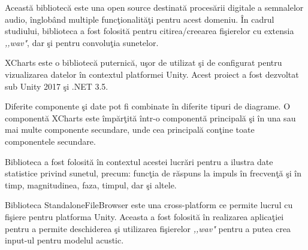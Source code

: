 	Aceast\u{a} bibliotec\u{a} este una open source destinat\u{a} proces\u{a}rii digitale a semnalelor audio, \^{i}nglob\^{a}nd multiple func\c{t}ionalit\u{a}\c{t}i pentru acest domeniu. \^{I}n cadrul studiului, biblioteca a fost folosit\u{a} pentru citirea/creearea fi\c{s}ierelor cu extensia \textit{,,wav"}, dar \c{s}i pentru convolu\c{t}ia sunetelor.
	\bigskip

	XCharts este o bibliotec\u{a} puternic\u{a}, u\c{s}or de utilizat \c{s}i de configurat pentru vizualizarea datelor \^{i}n contextul platformei Unity. Acest proiect a fost dezvoltat sub Unity 2017 \c{s}i .NET 3.5\cite{xcharts}.
	\bigskip
	
	Diferite componente \c{s}i date pot fi  combinate \^{i}n diferite tipuri de diagrame. O component\u{a} XCharts este \^{i}mp\u{a}r\c{t}it\u{a} \^{i}ntr-o component\u{a} principal\u{a} \c{s}i \^{i}n una sau mai multe componente secundare, unde cea principal\u{a} con\c{t}ine toate componentele secundare. 
	\bigskip
	
	Biblioteca a fost folosit\u{a} \^{i}n contextul acestei lucr\u{a}ri pentru a ilustra date statistice privind sunetul, precum: func\c{t}ia de r\u{a}spuns la impuls \^{i}n frecven\c{t}\u{a} \c{s}i \^{i}n timp, magnitudinea, faza, timpul, dar \c{s}i altele.
	\bigskip

	Biblioteca StandaloneFileBrowser este una cross-platform ce permite lucrul cu fi\c{s}iere pentru platforma Unity\cite{standalone}. Aceasta a fost folosit\u{a} \^{i}n realizarea aplica\c{t}iei pentru a permite deschiderea \c{s}i utilizarea fi\c{s}ierelor \textit{,,wav"} pentru a putea crea input-ul pentru modelul acustic.
	

	